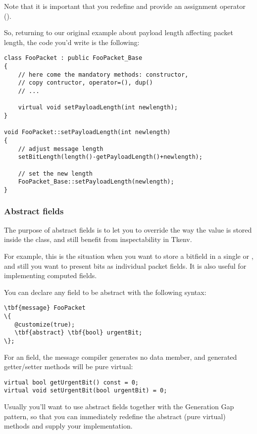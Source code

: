 Note that it is important that you redefine  and
provide an assignment operator ().

So, returning to our original example about payload length
affecting packet length, the code you'd write is the following:

\begin{verbatim}
class FooPacket : public FooPacket_Base
{
    // here come the mandatory methods: constructor,
    // copy contructor, operator=(), dup()
    // ...

    virtual void setPayloadLength(int newlength);
}

void FooPacket::setPayloadLength(int newlength)
{
    // adjust message length
    setBitLength(length()-getPayloadLength()+newlength);

    // set the new length
    FooPacket_Base::setPayloadLength(newlength);
}
\end{verbatim}



\subsubsection{Abstract fields}

The purpose of abstract fields is to let you to override
the way the value is stored inside the class,
and still benefit from inspectability in Tkenv.

For example, this is the situation when you want to store a bitfield
in a single  or , and still you want
to present bits as individual packet fields.
It is also useful for implementing computed fields.

You can declare any field to be abstract with the following syntax:

\begin{Verbatim}[commandchars=\\\{\}]
\tbf{message} FooPacket
\{
   @customize(true);
   \tbf{abstract} \tbf{bool} urgentBit;
\};
\end{Verbatim}

For an  field, the message compiler generates
no data member, and generated getter/setter methods will be pure
virtual:

\begin{verbatim}
virtual bool getUrgentBit() const = 0;
virtual void setUrgentBit(bool urgentBit) = 0;
\end{verbatim}


Usually you'll want to use abstract fields together with
the Generation Gap pattern, so that you can immediately
redefine the abstract (pure virtual) methods and
supply your implementation.



